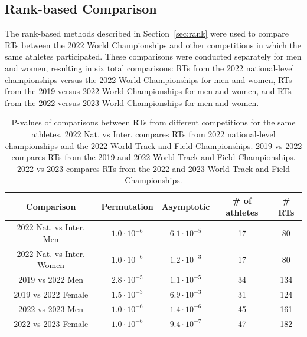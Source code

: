 \documentclass[12pt, letterpaper]{article}
\begin{document}
\subsection{Rank-based Comparison} \label{subsec:Results_Rank}

The rank-based methods described in Section~\ref{sec:rank} were used to
compare RTs between the 2022 World Championships and other
competitions in which the same athletes participated. These comparisons
were conducted separately for men and women, resulting in six total
comparisons: RTs from the 2022 national-level championships
versus the 2022 World Championships for men and women, RTs
from the 2019 versus 2022 World Championships for men and women, and
RTs from the 2022 versus 2023 World Championships for men and
women.


\begin{table}
  \centering
  \caption{P-values of comparisons between
    RTs from different competitions for the same athletes.
    2022 Nat. vs Inter. compares RTs from 2022 national-level
    championships and the 2022 World Track and Field Championships. 2019
    vs 2022 compares RTs from the 2019 and 2022 World Track and
    Field Championships. 2022 vs 2023 compares RTs from the
    2022 and 2023 World Track and Field Championships.}
  \begin{tabular}{c c c c c}
   \toprule
   Comparison & Permutation & Asymptotic & \# of athletes & \# RTs  \\
   \midrule
   2022 Nat. vs Inter. Men & $1.0 \cdot 10^{-6}$ & $ 6.1 \cdot 10^{-5}$ & 17 & 80 \\
   2022 Nat. vs Inter. Women & $1.0 \cdot 10^{-6}$ & $ 1.2 \cdot 10^{-3}$ & 17 & 80 \\[1ex]
   2019 vs 2022 Men & $2.8 \cdot 10^{-5}$ & $1.1 \cdot 10^{-5}$ & 34 & 134 \\
   2019 vs 2022 Female & $ 1.5 \cdot 10^{-3}$ & $6.9 \cdot 10^{-3}$ & 31 & 124 \\[1ex]
   2022 vs 2023 Men & $1.0 \cdot 10^{-6}$ & $1.4 \cdot 10^{-6}$ & 45 & 161 \\
   2022 vs 2023 Female & $1.0 \cdot 10^{-6}$ & $9.4 \cdot 10^{-7}$ & 47 & 182 \\
   \bottomrule
  \end{tabular}
  \label{tab:Clusrankresults}
\end{table}
\end{document}
